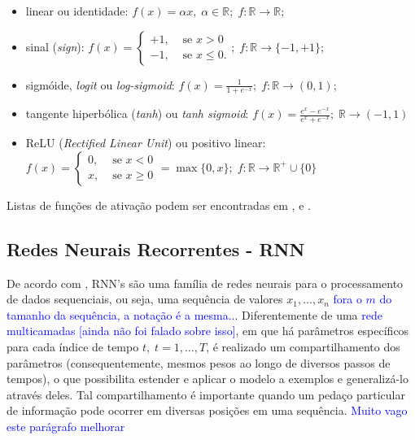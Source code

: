 \documentclass{automatextcc}
\newcommand{\pumi}[1]{\textcolor{blue}{#1}}
\newcommand{\R}{\mathds{R}}
\begin{document}
\begin{itemize}
    \item linear ou identidade: $f(x) = \alpha x, \; \alpha \in \R; \; f: \R \rightarrow \R$; 
    \item sinal (\textit{sign}): $f(x)=\begin{cases}
    +1, & \mbox{ se } x>0 \\
    -1, & \mbox{ se } x\leq 0.
    \end{cases}; \; f: \R \rightarrow \{-1,+1\}$;
    \item sigmóide, \textit{logit} ou \textit{log-sigmoid}: $f(x) = \frac{1}{1 + e^{-x}}; \; f: \R \rightarrow (0,1)$;
    \item tangente hiperbólica (\textit{tanh}) ou \textit{tanh sigmoid}: $f(x) = \frac{e^{x}-e^{-x}}{e^{x}+e^{-x}}; \; \R \rightarrow (-1,1)$
    \item ReLU (\textit{Rectified Linear Unit}) ou positivo linear: \\ $f(x) = \begin{cases}
    0, & \mbox{ se } x<0\\
    x, & \mbox{ se } x\geq 0
    \end{cases} = \max\{0,x\}; \; f: \R \rightarrow \R^{+} \cup \{0\} $
\end{itemize}
Listas de funções de ativação podem ser encontradas em \citet{nnDesign2014}, \citet{aggarwal2018DeepLearning} e \citet{dsa2021deeplearningbook}.

\subsection{Redes Neurais Recorrentes - RNN}
De acordo com \citet{mit2016deeplearningbook}, RNN's são uma família de redes neurais para o processamento de dados sequenciais, ou seja, uma sequência de valores $x_1,\dots,x_n$ \pumi{fora o $m$ do tamanho da sequência, a notação é a mesma..}. Diferentemente de uma \pumi{rede multicamadas [ainda não foi falado sobre isso]}, em que há parâmetros específicos para cada índice de tempo $t, \; t=1,\dots,T$, é realizado um compartilhamento dos parâmetros (consequentemente, mesmos pesos ao longo de diversos passos de tempos), o que possibilita estender e aplicar o modelo a exemplos e generalizá-lo através deles. Tal compartilhamento é importante quando um pedaço particular de informação pode ocorrer em diversas posições em uma sequência. \pumi{Muito vago este parágrafo melhorar}
\end{document}
